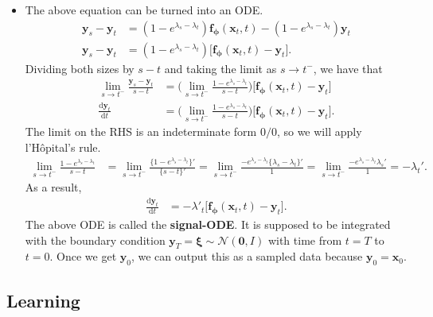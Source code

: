 \documentclass[10pt]{article}
\newcommand{\dee}{\mathrm{d}}
\newcommand{\ve}[1]{\mathbf{#1}}
\newcommand{\ves}[1]{\boldsymbol{#1}}
\newcommand{\mcal}[1]{\mathcal{#1}}
\begin{document}
\begin{itemize}
  \item The above equation can be turned into an ODE.
  \begin{align*}
    \ve{y}_s - \ve{y}_t &= (1 - e^{\lambda_s - \lambda_t}) \ve{f}_{\ves{\phi}}(\ve{x}_t, t)  - (1 - e^{\lambda_s - \lambda_t}) \ve{y}_t \\
    \ve{y}_s - \ve{y}_t &= (1 - e^{\lambda_s - \lambda_t}) \big[ \ve{f}_{\ves{\phi}}(\ve{x}_t, t)  - \ve{y}_t \big].
  \end{align*}
  Dividing both sizes by $s-t$ and taking the limit as $s \rightarrow t^-$, we have that
  \begin{align*}
    \lim_{s \rightarrow t^-} \frac{\ve{y}_s - \ve{y}_t}{s - t}
    &= \bigg( \lim_{s \rightarrow t^-} \frac{1 - e^{\lambda_s - \lambda_t}}{s-t}  \bigg) \big[ \ve{f}_{\ves{\phi}}(\ve{x}_t, t)  - \ve{y}_t \big]  \\
    \frac{\dee \ve{y}_t}{\dee t}
    &= \bigg( \lim_{s \rightarrow t^-} \frac{1 - e^{\lambda_s - \lambda_t}}{s-t}  \bigg) \big[ \ve{f}_{\ves{\phi}}(\ve{x}_t, t)  - \ve{y}_t \big].
  \end{align*}
  The limit on the RHS is an indeterminate form $0/0$, so we will apply l'H\^{o}pital's rule.
  \begin{align*}
    \lim_{s \rightarrow t^-} \frac{1 - e^{\lambda_s - \lambda_t}}{s-t}
    &= \lim_{s \rightarrow t^-} \frac{ \{1 - e^{\lambda_s - \lambda_t}\}' }{ \{ s-t \}'}
    = \lim_{s \rightarrow t^-} \frac{-e^{\lambda_s - \lambda_t} \{ \lambda_s - \lambda_t \}' }{1}
    = \lim_{s \rightarrow t^-} \frac{-e^{\lambda_s - \lambda_t} \lambda_s' }{1} 
    = -\lambda_t'.
  \end{align*}
  As a result,
  \begin{align*}
    \frac{\dee \ve{y}_t}{\dee t} &= -\lambda'_t \big[ \ve{f}_{\ves{\phi}}(\ve{x}_t, t)  - \ve{y}_t \big].
  \end{align*}
  The above ODE is called the {\bf signal-ODE}. It is supposed to be integrated with the boundary condition $\ve{y}_T = \ves{\xi} \sim \mcal{N}(\ve{0},I)$ with time from $t=T$ to $t = 0$. Once we get $\ve{y}_0$, we can output this as a sampled data because $\ve{y}_0 = \ve{x}_0$.
\end{itemize}

\subsection{Learning}
\end{document}
